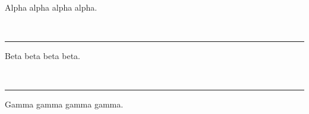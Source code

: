 \documentclass[11pt]{article}
\newcommand{\cvsection}[1]{\vspace{6pt}{\large\bfseries #1}\\[-6pt]\rule{\textwidth}{0.6pt}\vspace{2pt}}
\begin{document}
Alpha alpha alpha alpha.

\cvsection{Education}

Beta beta beta beta.

\cvsection{Experience}

Gamma gamma gamma gamma.
\end{document}
